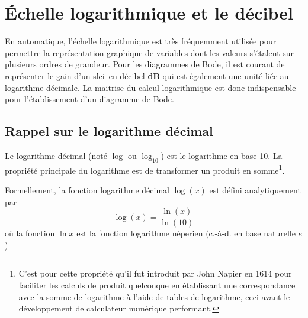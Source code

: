 \chapter{\'Echelle logarithmique et le décibel~\label{annexe-log}}
En automatique, l'échelle logarithmique est très fréquemment 
utilisée pour permettre la représentation
graphique de variables dont les valeurs s'étalent sur plusieurs ordres 
de grandeur. Pour les diagrammes de Bode, il est courant de représenter le gain 
d'un \gls{slci}~en décibel \textbf{dB} qui est également une unité liée au 
logarithme décimale. La maitrise du calcul logarithmique est donc indispensable
pour l'établissement d'un diagramme de Bode.
\section{Rappel sur le logarithme décimal}
Le logarithme décimal (noté $\log$ ou $\log_{10}$) est le logarithme en base 10.
La propriété principale du logarithme est de transformer un produit en 
somme\footnote{C'est pour cette propriété qu'il fut introduit par John Napier 
en 1614 pour faciliter les calculs de produit quelconque en établissant une 
correspondance avec la somme de logarithme à l'aide de tables de logarithme, 
ceci avant le développement de calculateur numérique performant.}.

Formellement, la fonction logarithme décimal $\log{(x)}$ est défini 
analytiquement par 
\[
\log{(x)}=\dfrac{\ln{(x)}}{\ln{(10)}}
\]
où la fonction $\ln{x}$ est la fonction logarithme néperien (c.-à-d. en base 
naturelle $e$) 
